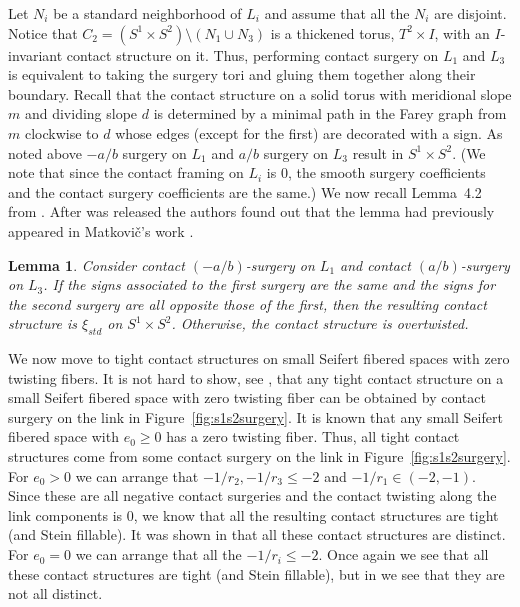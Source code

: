 \documentclass[11pt]{amsart}
\theoremstyle{plain}
\newtheorem{lemma}[theorem]{Lemma}
\theoremstyle{definition}
\theoremstyle{remark}
\numberwithin{theorem}{section}
\begin{document}
Let $N_i$ be a standard neighborhood of $L_i$ and assume that all the $N_i$ are disjoint. Notice that $C_2=(S^1\times S^2)\setminus (N_1\cup N_3)$ is a thickened torus, $T^2\times I$, with an $I$-invariant contact structure on it. Thus, performing contact surgery on $L_1$ and $L_3$ is equivalent to taking the surgery tori and gluing them together along their boundary. Recall that the contact structure on a solid torus with meridional slope $m$ and dividing slope $d$ is determined by a minimal path in the Farey graph from $m$ clockwise to $d$ whose edges (except for the first) are decorated with a sign. As noted above $-a/b$ surgery on $L_1$ and $a/b$ surgery on $L_3$ result in $S^1\times S^2$. (We note that since the contact framing on $L_i$ is $0$, the smooth surgery coefficients and the contact surgery coefficients are the same.) We now recall Lemma~4.2 from \cite{EtnyreOzbagciTosun2025}. After \cite{EtnyreOzbagciTosun2025} was released the authors found out that the lemma had previously appeared in Matkovi\v c's work \cite{Matkovic23}.
\begin{lemma}\label{balanced}
Consider contact $(-a/b)$-surgery on $L_1$ and contact $(a/b)$-surgery on $L_3$. If the signs associated to the first surgery are the same and the signs for the second surgery are all opposite those of the first, then the resulting contact structure is $\xi_{std}$ on $S^1\times S^2$. Otherwise, the contact structure is overtwisted. 
\end{lemma}



We now move to tight contact structures on small Seifert fibered spaces with zero twisting fibers. It is not hard to show, see \cite{GhigginiLiscaStipsicz06, LiscaStipsicz07, Wu04}, that any tight contact structure on a small Seifert fibered space with zero twisting fiber can be obtained by contact surgery on the link in Figure~\ref{fig:s1s2surgery}. 
It is known \cite{Wu04, Wu06} that any small Seifert fibered space with $e_0\geq 0$ has a zero twisting fiber. Thus, all tight contact structures come from some contact surgery on the link in Figure~\ref{fig:s1s2surgery}. For $e_0>0$ we can arrange that $-1/r_2, -1/r_3\leq -2$ and $-1/r_1\in(-2,-1)$. Since these are all negative contact surgeries and the contact twisting along the link components is $0$, we know that all the resulting contact structures are tight (and Stein fillable). It was shown in \cite{GhigginiLiscaStipsicz06, Wu04} that all these contact structures are distinct. For $e_0=0$ we can arrange that all the $-1/r_i\leq -2$. Once again we see that all these contact structures are tight (and Stein fillable), but in \cite{GhigginiLiscaStipsicz06} we see that they are not all distinct. 
\end{document}

